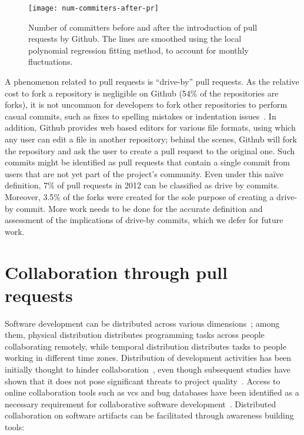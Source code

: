 \documentclass{sig-alternate}
\begin{document}
\begin{figure}
  \begin{center}
    \texttt{[image: num-commiters-after-pr]}
  \end{center}
  \caption{Number of committers before and after the introduction of pull
  requests by Github. The lines are smoothed using the local polynomial
  regression fitting method, to account for monthly fluctuations.}
  \label{fig:before-after-pr}
\end{figure}

A phenomenon related to pull requests is ``drive-by'' pull requests. As the
relative cost to fork a repository is negligible on Github (54\% of the
repositories are forks), it is not uncommon for developers to fork other
repositories to perform casual commits, such as fixes to spelling mistakes or
indentation issues~\cite{Pham13}. In addition, Github provides web based editors
for various file formats, using which any user can edit a file in another
repository; behind the scenes, Github will fork the repository and ask the user
to create a pull request to the original one. Such commits might be identified
as pull requests that contain a single commit from users that are not yet part
of the project's community. Even under this na\"ive definition, 7\% of pull
requests in 2012 can be classified as drive by commits. Moreover, 3.5\% of the
forks were created for the sole purpose of creating a drive-by commit. More
work needs to be done for the accurate definition and assessment of the
implications of drive-by commits, which we defer for future work.

\section{Collaboration through pull requests}

Software development can be distributed across various dimensions~\cite{Gumm06};
among them, physical distribution distributes programming tasks across people
collaborating remotely, while temporal distribution distributes tasks to people
working in different time zones. Distribution of development activities has been
initially thought to hinder collaboration~\cite{Herbs99, Batti01}, even though
subsequent studies have shown that it does not pose significant threats to
project quality~\cite{Spine06, Nguye08, Bird09a}. Access to online collaboration
tools such as {\sc vcs} and bug databases have been identified as a necessary
requirement for collaborative software development~\cite{Knuds76,Pilat06,
Catal06}. Distributed collaboration on software artifacts can be facilitated
through awareness building tools: 
\end{document}
